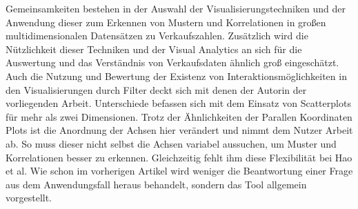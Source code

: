 \documentclass[usegeometry=true]{scrartcl}
\begin{document}
Gemeinsamkeiten bestehen in der Auswahl der Visualisierungstechniken und der Anwendung dieser zum Erkennen von Mustern und Korrelationen in großen multidimensionalen Datensätzen zu Verkaufszahlen.
Zusätzlich wird die Nützlichkeit dieser Techniken und der Visual Analytics an sich für die Auswertung und das Verständnis von Verkaufsdaten ähnlich groß eingeschätzt.
Auch die Nutzung und Bewertung der Existenz von Interaktionsmöglichkeiten in den Visualisierungen durch Filter deckt sich mit denen der Autorin der vorliegenden Arbeit.
Unterschiede befassen sich mit dem Einsatz von Scatterplots für mehr als zwei Dimensionen.
Trotz der Ähnlichkeiten der Parallen Koordinaten Plots ist die Anordnung der Achsen hier verändert und nimmt dem Nutzer Arbeit ab. 
So muss dieser nicht selbst die Achsen variabel aussuchen, um Muster und Korrelationen besser zu erkennen. 
Gleichzeitig fehlt ihm diese Flexibilität bei Hao et al.
Wie schon im vorherigen Artikel wird weniger die Beantwortung einer Frage aus dem Anwendungsfall heraus behandelt, sondern das Tool allgemein vorgestellt.
\end{document}

